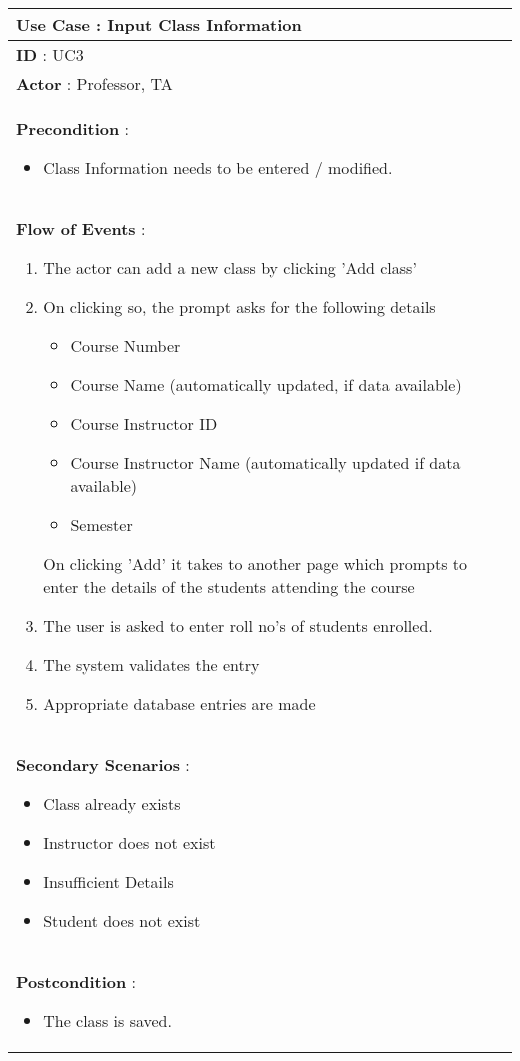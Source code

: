 \documentclass[paper=a4, fontsize=15pt]{scrartcl}
\begin{document}
 
  
\begin{tabular}{|p{36em}|} 
 \hline
 \textbf{Use Case : Input Class Information}\\
 \hline
 \textbf{ID } : UC3\\
 \hline
 \textbf{Actor }: Professor, TA\\
 \hline
 \textbf{Precondition }:
 \begin{itemize}[topsep=0pt]
     \item Class Information needs to be entered / modified.
 \end{itemize}\\
 \hline
 \textbf{Flow of Events }:
 \begin{enumerate}[topsep=0pt]
     \item The actor can add a new class by clicking 'Add class'
     \item On clicking so, the prompt asks for the following details
     \begin{itemize}[topsep=0pt]
         \item Course Number 
         \item Course Name (automatically updated, if data available)
         \item Course Instructor ID
         \item Course Instructor Name (automatically updated if data available)
         \item Semester
     \end{itemize}
     On clicking 'Add' it takes to another page which prompts to enter the details of the students attending the course
     \item The user is asked to enter roll no's of students enrolled.
     \item The system validates the entry
     \item Appropriate database entries are made
 \end{enumerate}\\
 \hline
 \textbf{Secondary Scenarios }:
 \begin{itemize}[topsep=0pt]
     \item Class already exists
     \item Instructor does not exist
     \item Insufficient Details
     \item Student does not exist
 \end{itemize}\\
 \hline 
 \textbf{Postcondition }:
 \begin{itemize}[topsep=0pt]
     \item The class is saved.     
 \end{itemize}\\
 \hline
 
 
 \end{tabular}
 
\end{document}
